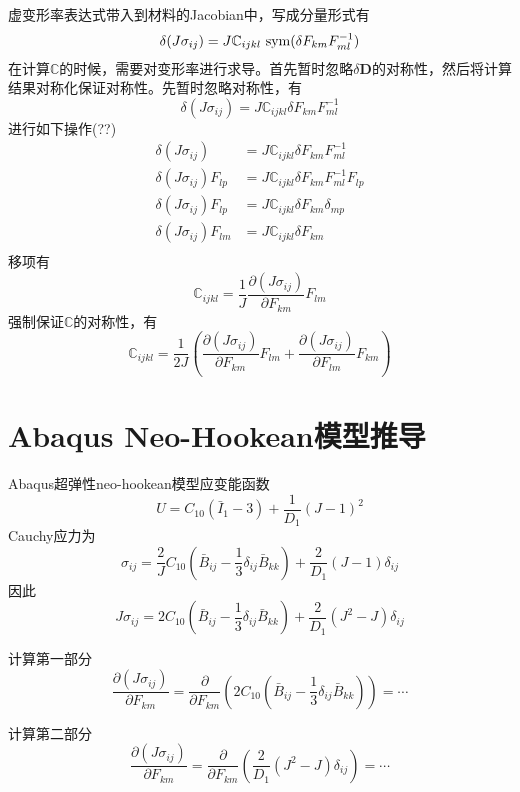 \documentclass{article}
\begin{document}
虚变形率表达式带入到材料的Jacobian中，写成分量形式有
$$\delta(J\sigma_{ij})=J \mathbb{C}_{ijkl}\ {\rm sym} (\delta F_{km}F_{ml}^{-1})$$
在计算$\mathbb{C}$的时候，需要对变形率进行求导。首先暂时忽略$\delta \bm{D}$的对称性，然后将计算结果对称化保证对称性。先暂时忽略对称性，有
$$\delta(J\sigma_{ij})=J \mathbb{C}_{ijkl} \delta F_{km}F_{ml}^{-1}$$
进行如下操作(??)
\begin{equation*}
    \begin{aligned}
        \delta(J\sigma_{ij})&=J \mathbb{C}_{ijkl} \delta F_{km}F_{ml}^{-1}             \\
        \delta(J\sigma_{ij})F_{lp}&=J \mathbb{C}_{ijkl} \delta F_{km}F_{ml}^{-1}F_{lp} \\
        \delta(J\sigma_{ij})F_{lp}&=J \mathbb{C}_{ijkl} \delta F_{km}\delta_{mp}             \\
        \delta(J\sigma_{ij})F_{lm}&=J \mathbb{C}_{ijkl} \delta F_{km}                  \\
    \end{aligned}
\end{equation*}
移项有
$$\mathbb{C}_{ijkl}=\frac{1}{J}\frac{\partial(J\sigma_{ij})}{\partial F_{km}}F_{lm}$$
强制保证$\mathbb{C}$的对称性，有
$$\mathbb{C}_{ijkl}=\frac{1}{2J}\left(\frac{\partial(J\sigma_{ij})}{\partial F_{km}}F_{lm} + \frac{\partial(J\sigma_{ij})}{\partial F_{lm}}F_{km} \right)$$

\section{Abaqus Neo-Hookean模型推导}

Abaqus超弹性neo-hookean模型应变能函数\cite{abaqus}
$$U=C_{10}(\bar{I}_1-3)+\frac{1}{D_1}(J-1)^2$$
Cauchy应力为
$$\sigma_{ij}=\frac{2}{J}C_{10}(\bar{B}_{ij}-\frac{1}{3}\delta_{ij}\bar{B}_{kk})+\frac{2}{D_1}(J-1)\delta_{ij}$$
因此
$$J\sigma_{ij}=2C_{10}(\bar{B}_{ij}-\frac{1}{3}\delta_{ij}\bar{B}_{kk})+\frac{2}{D_1}(J^2-J)\delta_{ij}$$

计算第一部分
$$\frac{\partial (J\sigma_{ij})}{\partial F_{km}}=\frac{\partial}{\partial F_{km}}\left(2C_{10}(\bar{B}_{ij}-\frac{1}{3}\delta_{ij}\bar{B}_{kk})\right)=\cdots$$

计算第二部分
$$\frac{\partial (J\sigma_{ij})}{\partial F_{km}}=\frac{\partial}{\partial F_{km}}\left(\frac{2}{D_1}(J^2-J)\delta_{ij}\right)=\cdots$$
\end{document}
